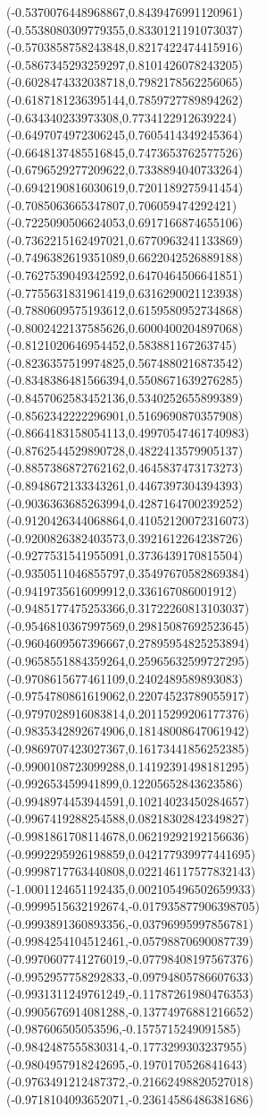 {(-0.5370076448968867,0.8439476991120961)
(-0.5538080309779355,0.8330121191073037)
(-0.5703858758243848,0.8217422474415916)
(-0.5867345293259297,0.8101426078243205)
(-0.6028474332038718,0.7982178562256065)
(-0.6187181236395144,0.7859727789894262)
(-0.634340233973308,0.7734122912639224)
(-0.6497074972306245,0.7605414349245364)
(-0.6648137485516845,0.7473653762577526)
(-0.6796529277209622,0.7338894040733264)
(-0.6942190816030619,0.7201189275941454)
(-0.7085063665347807,0.706059474292421)
(-0.7225090506624053,0.6917166874655106)
(-0.7362215162497021,0.6770963241133869)
(-0.7496382619351089,0.6622042526889188)
(-0.7627539049342592,0.6470464506641851)
(-0.7755631831961419,0.6316290021123938)
(-0.7880609575193612,0.6159580952734868)
(-0.8002422137585626,0.6000400204897068)
(-0.8121020646954452,0.583881167263745)
(-0.8236357519974825,0.5674880216873542)
(-0.8348386481566394,0.5508671639276285)
(-0.8457062583452136,0.5340252655899389)
(-0.8562342222296901,0.5169690870357908)
(-0.8664183158054113,0.49970547461740983)
(-0.8762544529890728,0.4822413579905137)
(-0.8857386872762162,0.4645837473173273)
(-0.8948672133343261,0.4467397304394393)
(-0.9036363685263994,0.4287164700239252)
(-0.9120426344068864,0.41052120072316073)
(-0.9200826382403573,0.3921612264238726)
(-0.9277531541955091,0.3736439170815504)
(-0.9350511046855797,0.35497670582869384)
(-0.9419735616099912,0.336167086001912)
(-0.9485177475253366,0.31722260813103037)
(-0.9546810367997569,0.29815087692523645)
(-0.9604609567396667,0.27895954825253894)
(-0.9658551884359264,0.25965632599727295)
(-0.9708615677461109,0.2402489589893083)
(-0.9754780861619062,0.22074523789055917)
(-0.9797028916083814,0.20115299206177376)
(-0.9835342892674906,0.18148008647061942)
(-0.9869707423027367,0.16173441856252385)
(-0.9900108723099288,0.14192391498181295)
(-0.992653459941899,0.12205652843623586)
(-0.9948974453944591,0.10214023450284657)
(-0.9967419288254588,0.08218302842349827)
(-0.9981861708114678,0.06219292192156636)
(-0.9992295926198859,0.042177939977441695)
(-0.9998717763440808,0.022146117577832143)
(-1.0001124651192435,0.002105496502659933)
(-0.9999515632192674,-0.017935877906398705)
(-0.9993891360893356,-0.03796995997856781)
(-0.9984254104512461,-0.05798870690087739)
(-0.9970607741276019,-0.07798408197567376)
(-0.9952957758292833,-0.09794805786607633)
(-0.9931311249761249,-0.11787261980476353)
(-0.9905676914081288,-0.13774976881216652)
(-0.987606505053596,-0.1575715249091585)
(-0.9842487555830314,-0.1773299303237955)
(-0.9804957918242695,-0.1970170526841643)
(-0.9763491212487372,-0.21662498820527018)
(-0.9718104093652071,-0.23614586486381686)
}
